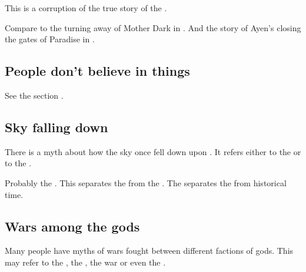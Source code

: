 This is a corruption of the true story of the . 

Compare to the turning away of Mother Dark in \cite{StevenEriksonIanCameronEsslemont:MalazanBookoftheFallen}. 
And the story of Ayen's closing the gates of Paradise in . 









\subsection{People don't believe in things}
See the section . 









\subsection{Sky falling down}
There is a myth about how the sky once fell down upon \Miith{}. It refers either to the \secondbanewar{} or to the \CuezcanApocalypse. 

Probably the \secondbanewar. This separates the  from the . The \CuezcanApocalypse{} separates the  from historical time. 










\subsection{Wars among the gods}
Many people have myths of wars fought between different factions of gods. This may refer to the \banewars, the \resphanwars{}, the \Merkyran{} war or even the . 















